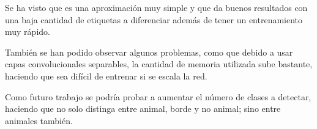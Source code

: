 \documentclass[a4paper]{article}
\begin{document}
Se ha visto que es una aproximación muy simple y que da buenos resultados con una baja cantidad de etiquetas a diferenciar además de tener un entrenamiento muy rápido.\newline

También se han podido observar algunos problemas, como que debido a usar capas convolucionales separables, la cantidad de memoria utilizada sube bastante, haciendo que sea difícil de entrenar si se escala la red.\newline

Como futuro trabajo se podría probar a aumentar el número de clases a detectar, haciendo que no solo distinga entre animal, borde y no animal; sino entre animales también.

\newpage
\printbibliography
\end{document}
